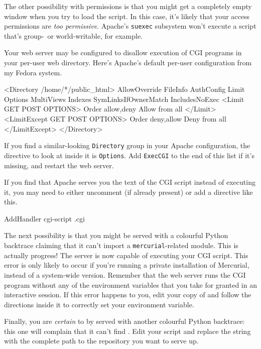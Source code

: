 The other possibility with permissions is that you might get a
completely empty window when you try to load the script.  In this
case, it's likely that your access permissions are \emph{too
  permissive}.  Apache's \texttt{suexec} subsystem won't execute a
script that's group-~or world-writable, for example.

Your web server may be configured to disallow execution of CGI
programs in your per-user web directory.  Here's Apache's
default per-user configuration from my Fedora system.
\begin{codesample2}
  <Directory /home/*/public_html>
      AllowOverride FileInfo AuthConfig Limit
      Options MultiViews Indexes SymLinksIfOwnerMatch IncludesNoExec
      <Limit GET POST OPTIONS>
          Order allow,deny
          Allow from all
      </Limit>
      <LimitExcept GET POST OPTIONS>
          Order deny,allow
          Deny from all
      </LimitExcept>
  </Directory>
\end{codesample2}
If you find a similar-looking \texttt{Directory} group in your Apache
configuration, the directive to look at inside it is \texttt{Options}.
Add \texttt{ExecCGI} to the end of this list if it's missing, and
restart the web server.

If you find that Apache serves you the text of the CGI script instead
of executing it, you may need to either uncomment (if already present)
or add a directive like this.
\begin{codesample2}
  AddHandler cgi-script .cgi
\end{codesample2}

The next possibility is that you might be served with a colourful
Python backtrace claiming that it can't import a
\texttt{mercurial}-related module.  This is actually progress!  The
server is now capable of executing your CGI script.  This error is
only likely to occur if you're running a private installation of
Mercurial, instead of a system-wide version.  Remember that the web
server runs the CGI program without any of the environment variables
that you take for granted in an interactive session.  If this error
happens to you, edit your copy of  and follow the
directions inside it to correctly set your 
environment variable.

Finally, you are \emph{certain} to by served with another colourful
Python backtrace: this one will complain that it can't find
.  Edit your  script
and replace the  string with the complete
path to the repository you want to serve up.

